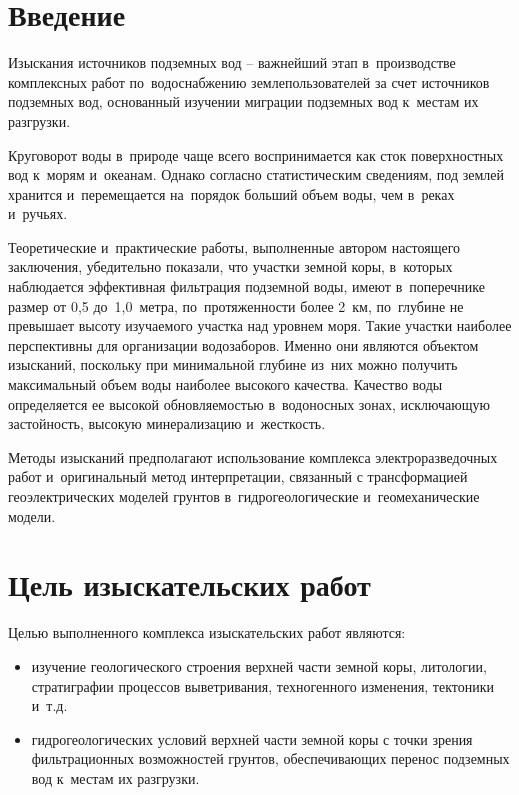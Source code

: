 \listoffigures


\bigskip


\newpage

\section{Введение}

Изыскания источников подземных вод -- важнейший этап в~производстве комплексных работ по~водоснабжению землепользователей за счет источников подземных вод, основанный изучении миграции подземных вод к~местам их разгрузки.

Круговорот воды в~природе чаще всего воспринимается как сток поверхностных вод к~морям и~океанам. Однако согласно статистическим сведениям, под землей хранится и~перемещается на~порядок больший объем воды, чем в~реках и~ручьях.

Теоретические и~практические работы, выполненные автором настоящего заключения, убедительно показали, что участки земной коры, в~которых наблюдается эффективная фильтрация подземной воды, имеют в~поперечнике размер от 0,5 до~1,0~метра, по~протяженности более 2~км, по~глубине не превышает высоту изучаемого участка над уровнем моря. Такие участки наиболее перспективны для организации водозаборов. Именно они являются объектом изысканий, поскольку при минимальной глубине из~них можно получить максимальный объем воды наиболее высокого качества. Качество воды определяется ее высокой обновляемостью в~водоносных зонах, исключающую застойность, высокую минерализацию и~жесткость.

Методы изысканий предполагают использование комплекса электроразведочных работ и~оригинальный метод интерпретации, связанный с трансформацией геоэлектрических моделей грунтов в~гидрогеологические и~геомеханические модели.

\section{Цель изыскательских работ}
Целью выполненного комплекса изыскательских работ являются:
\begin{itemize}
	\item изучение геологического строения верхней части земной коры, литологии, стратиграфии процессов выветривания, техногенного изменения, тектоники и~т.д.
	\item гидрогеологических условий верхней части земной коры с точки зрения фильтрационных возможностей грунтов, обеспечивающих перенос подземных вод к~местам их разгрузки.
\end{itemize}


